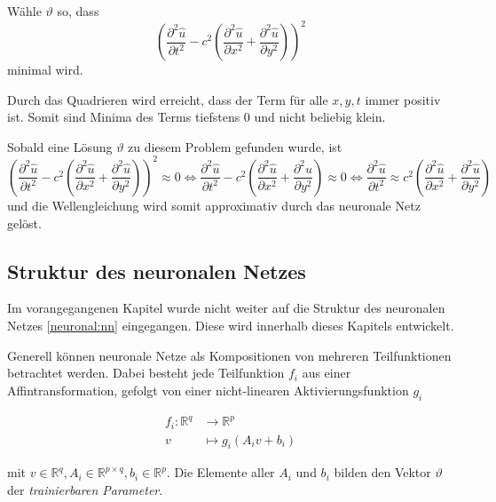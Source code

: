 Wähle \( \vartheta \) so, dass
\begin{equation}
    \left(\frac{\partial^2 \hat{u}}{\partial t^2} - c^2 \left( \frac{\partial^2 \hat{u}}{\partial x^2} + \frac{\partial^2 \hat{u}}{\partial y^2} \right)\right)^2
    \label{neuronal:optimierung}
\end{equation}
minimal wird.\newline

Durch das Quadrieren wird erreicht, dass der Term für alle \( x, y, t \) immer positiv ist.
Somit sind Minima des Terms tiefstens 0 und nicht beliebig klein.

Sobald eine Lösung \( \vartheta \) zu diesem Problem gefunden wurde, ist
\begin{equation}
    \left(\frac{\partial^2 \hat{u}}{\partial t^2} - c^2 \left( \frac{\partial^2 \hat{u}}{\partial x^2} + \frac{\partial^2 \hat{u}}{\partial y^2} \right)\right)^2 \approx 0
    \iff
    \frac{\partial^2 \hat{u}}{\partial t^2} - c^2 \left( \frac{\partial^2 \hat{u}}{\partial x^2} + \frac{\partial^2 \hat{u}}{\partial y^2} \right) \approx 0
    \iff
    \frac{\partial^2 \hat{u}}{\partial t^2} \approx c^2 \left( \frac{\partial^2 \hat{u}}{\partial x^2} + \frac{\partial^2 \hat{u}}{\partial y^2} \right)
\end{equation}
und die Wellengleichung wird somit approximativ durch das neuronale Netz gelöst.


\subsection{Struktur des neuronalen Netzes}\label{neuronal:subsection:struktur_nn}

Im vorangegangenen Kapitel wurde nicht weiter auf die Struktur des neuronalen Netzes \eqref{neuronal:nn} eingegangen.
Diese wird innerhalb dieses Kapitels entwickelt.

Generell können neuronale Netze als Kompositionen von mehreren Teilfunktionen betrachtet werden.
Dabei besteht jede Teilfunktion \( f_i \) aus einer Affintransformation, gefolgt von einer nicht-linearen Aktivierungsfunktion \( g_i \)

\begin{align*}
    f_i\colon \mathbb{R}^q & \longrightarrow\mathbb{R}^p \\[-1ex]
    v & \longmapsto g_i(A_iv + b_i)
\end{align*}

mit \( v \in \mathbb{R}^q, A_i \in \mathbb{R}^{p \times q}, b_i \in \mathbb{R}^p \). 
Die Elemente aller \( A_i \) und \( b_i \) bilden den Vektor \( \vartheta \) der \emph{trainierbaren Parameter}.

